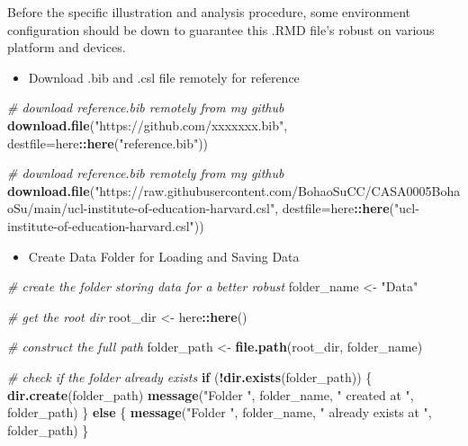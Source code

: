 \documentclass[
]{article}
\newenvironment{Shaded}{\begin{snugshade}}{\end{snugshade}}
\newcommand{\AttributeTok}[1]{\textcolor[rgb]{0.13,0.29,0.53}{#1}}
\newcommand{\CommentTok}[1]{\textcolor[rgb]{0.56,0.35,0.01}{\textit{#1}}}
\newcommand{\ControlFlowTok}[1]{\textcolor[rgb]{0.13,0.29,0.53}{\textbf{#1}}}
\newcommand{\FunctionTok}[1]{\textcolor[rgb]{0.13,0.29,0.53}{\textbf{#1}}}
\newcommand{\NormalTok}[1]{#1}
\newcommand{\OtherTok}[1]{\textcolor[rgb]{0.56,0.35,0.01}{#1}}
\newcommand{\SpecialCharTok}[1]{\textcolor[rgb]{0.81,0.36,0.00}{\textbf{#1}}}
\newcommand{\StringTok}[1]{\textcolor[rgb]{0.31,0.60,0.02}{#1}}
\providecommand{\tightlist}{%
  \setlength{\itemsep}{0pt}\setlength{\parskip}{0pt}}
\begin{document}
Before the specific illustration and analysis procedure, some
environment configuration should be down to guarantee this .RMD file's
robust on various platform and devices.

\begin{itemize}
\tightlist
\item
  Download .bib and .csl file remotely for reference
\end{itemize}

\begin{Shaded}
\begin{Highlighting}[]
\CommentTok{\# download reference.bib remotely from my github}
\FunctionTok{download.file}\NormalTok{(}\StringTok{"https://github.com/xxxxxxx.bib"}\NormalTok{, }
              \AttributeTok{destfile=}\NormalTok{here}\SpecialCharTok{::}\FunctionTok{here}\NormalTok{(}\StringTok{"reference.bib"}\NormalTok{))}

\CommentTok{\# download reference.bib remotely from my github}
\FunctionTok{download.file}\NormalTok{(}\StringTok{"https://raw.githubusercontent.com/BohaoSuCC/CASA0005BohaoSu/main/ucl{-}institute{-}of{-}education{-}harvard.csl"}\NormalTok{, }
              \AttributeTok{destfile=}\NormalTok{here}\SpecialCharTok{::}\FunctionTok{here}\NormalTok{(}\StringTok{"ucl{-}institute{-}of{-}education{-}harvard.csl"}\NormalTok{))}
\end{Highlighting}
\end{Shaded}

\begin{itemize}
\tightlist
\item
  Create Data Folder for Loading and Saving Data
\end{itemize}

\begin{Shaded}
\begin{Highlighting}[]
\CommentTok{\# create the folder storing data for a better robust}
\NormalTok{folder\_name }\OtherTok{\textless{}{-}} \StringTok{"Data"}

\CommentTok{\# get the root dir}
\NormalTok{root\_dir }\OtherTok{\textless{}{-}}\NormalTok{ here}\SpecialCharTok{::}\FunctionTok{here}\NormalTok{()}

\CommentTok{\# construct the full path}
\NormalTok{folder\_path }\OtherTok{\textless{}{-}} \FunctionTok{file.path}\NormalTok{(root\_dir, folder\_name)}

\CommentTok{\# check if the folder already exists}
\ControlFlowTok{if}\NormalTok{ (}\SpecialCharTok{!}\FunctionTok{dir.exists}\NormalTok{(folder\_path)) \{}
  \FunctionTok{dir.create}\NormalTok{(folder\_path)}
  \FunctionTok{message}\NormalTok{(}\StringTok{"Folder \textquotesingle{}"}\NormalTok{, folder\_name, }\StringTok{"\textquotesingle{} created at "}\NormalTok{, folder\_path)}
\NormalTok{\} }\ControlFlowTok{else}\NormalTok{ \{}
  \FunctionTok{message}\NormalTok{(}\StringTok{"Folder \textquotesingle{}"}\NormalTok{, folder\_name, }\StringTok{"\textquotesingle{} already exists at "}\NormalTok{, folder\_path)}
\NormalTok{\}}
\end{Highlighting}
\end{Shaded}
\end{document}
